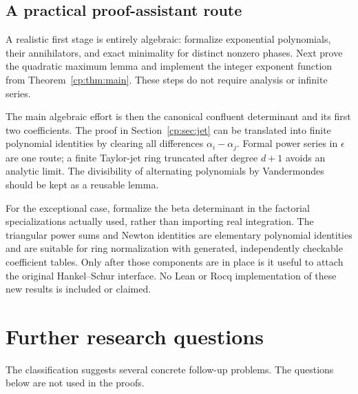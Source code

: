 \documentclass[11pt]{article}
\theoremstyle{definition}
\theoremstyle{remark}
\theoremstyle{definition}
\theoremstyle{plain}
\numberwithin{equation}{section}
\begin{document}
\subsection{A practical proof-assistant route}
A realistic first stage is entirely algebraic: formalize exponential
polynomials, their annihilators, and exact minimality for distinct nonzero
phases. Next prove the quadratic maximum lemma and implement the integer
exponent function from Theorem~\ref{cp:thm:main}. These steps do not require
analysis or infinite series.

The main algebraic effort is then the canonical confluent determinant and
its first two coefficients. The proof in Section~\ref{cp:sec:jet} can be
translated into finite polynomial identities by clearing all differences
$\alpha_i-\alpha_j$. Formal power series in $\epsilon$ are one route;
a finite Taylor-jet ring truncated after degree $d+1$ avoids an analytic
limit. The divisibility of alternating polynomials by Vandermondes should
be kept as a reusable lemma.

For the exceptional case, formalize the beta determinant in the factorial
specializations actually used, rather than importing real integration.
The triangular power sums and Newton identities are elementary polynomial
identities and are suitable for ring normalization with generated,
independently checkable coefficient tables. Only after those components are
in place is it useful to attach the original Hankel--Schur interface.
No Lean or Rocq implementation of these new results is included or claimed.

\section{Further research questions}
\label{cp:sec:further}
The classification suggests several concrete follow-up problems. The
questions below are not used in the proofs.

\noindent[Added 30 September 2026, batch 66: none of these questions repeats one of
Part~II's. Section~\ref{cp:q:middle} and Section~\ref{cp:q:certified}
continue Part~II's topic ``Broader noncollision criteria and certified
algorithms'' (Section~\ref{cp:sec:rs-noncollision}), on which
Theorem~\ref{cp:thm:jet} bears; Section~\ref{cp:q:numerators} is related
to Part~II's Section~\ref{cp:sec:rs-conj17} on Cigler's Conjecture~17, as
it says; Section~\ref{cp:q:detuning} moves the parameter near a root of
unity, whereas Part~II's ``uniform crossover as the poles merge'' moves it
to $t=1$.]
\end{document}
